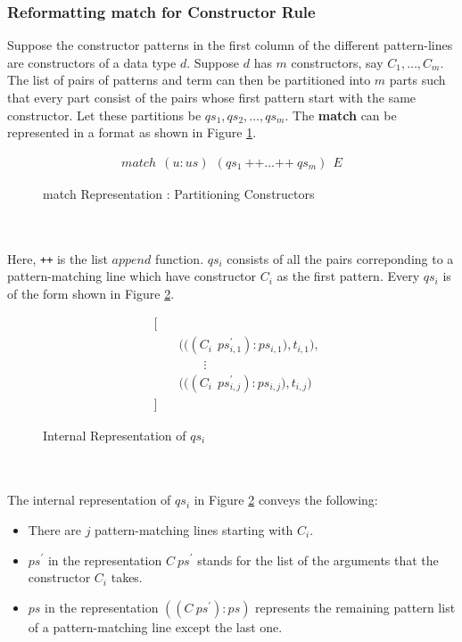 \documentclass[11pt]{article}
\begin{document}
\subsubsection {Reformatting match for Constructor Rule}\label{pmatch:reformatConsRule}
Suppose the constructor patterns in the first column of the different pattern-lines are constructors of a data type $d$. Suppose $d$ has $m$ constructors, say $C_1,\ldots,C_m$. The list of pairs of patterns and term can then be partitioned into $m$ parts such that every part consist of the pairs whose first pattern start with the same constructor. Let these partitions be $qs_1,qs_2,\ldots,qs_m$. The {\bf match} can be represented in a format as shown in Figure \ref {fig:Pmatch_PartCons}.
\begin{figure}
\begin{align*}
  match~~(u:us)~~(qs_1 ~ \texttt{++} \ldots \texttt{++}~qs_m)~~ E
\end{align*}
\caption{match Representation : Partitioning Constructors} \label{fig:Pmatch_PartCons}
\end{figure}
~~\\~~\\
Here, \texttt{++} is the list $append$ function. $qs_i$ consists of all the pairs correponding to a pattern-matching line which have constructor $C_i$ as the first pattern. Every $qs_i$ is of the form shown in Figure \ref {fig:PMatch_QsForm}.
\begin{figure}
\begin{align*}
&\bigg[\\
&\qquad \bigg(\Big((C_i~~ps_{i,1}^{\prime}):ps_{i,1}\Big),t_{i,1}\bigg), \\ 
&\qquad \qquad \vdots \\
&\qquad \bigg(\Big((C_i~~ps_{i,j}^{\prime}):ps_{i,j}\Big),t_{i,j}\bigg) \\ 
&\bigg]
\end{align*}
\caption{Internal Representation of $qs_i$} \label{fig:PMatch_QsForm}
\end{figure}
~~\\~~\\
The internal representation of $qs_i$ in Figure \ref {fig:PMatch_QsForm} conveys the following:
\begin{itemize}
  \item There are $j$ pattern-matching lines starting with $C_i$.
  \item $ps^\prime$ in the representation $C~ps^\prime$ stands for the list of the arguments that the constructor $C_i$ takes.
  \item $ps$ in the representation $((C~ps^\prime):ps)$ represents the remaining pattern list of a pattern-matching line except the last one.
\end{itemize}
\end{document}

